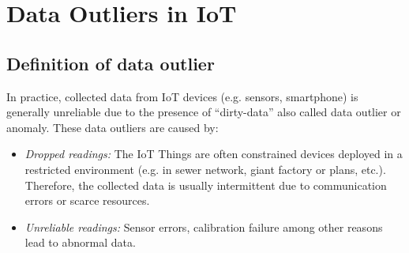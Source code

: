 

\section{Data Outliers in IoT}
\subsection{Definition of data outlier}


In practice, collected data from IoT devices (e.g. sensors, smartphone) is generally unreliable due to the presence of ``dirty-data'' also called data outlier or anomaly. These data outliers are caused by:
\begin{itemize}
    \item \textit{Dropped readings: } The IoT Things are often constrained devices deployed in a restricted environment (e.g. in sewer network, giant factory or plans, etc.). Therefore, the collected data is usually intermittent due to communication errors or scarce resources. 
    \item \textit{Unreliable readings: } Sensor errors, calibration failure among other reasons lead to abnormal data. 
\end{itemize}

